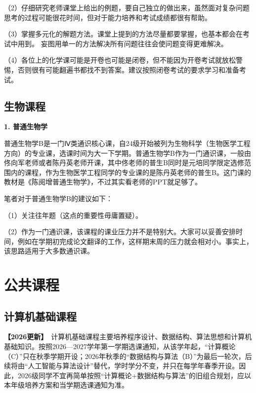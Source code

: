 \documentclass[11pt,oneside]{book}
\newcommand{\updateMark}{\textcolor{chaph}{\textbf{【2026更新】}}\ }
\begin{document}
\vspace{10pt}

（2）仔细研究老师课堂上给出的例题，要自己独立的做出来，虽然面对复杂问题思考的过程可能很花时间，但对于能力培养和考试成绩都很有帮助。

\vspace{10pt}

（3）掌握多元化的解题方法。课堂上提到的方法尽量都要掌握，也基本都会在考试中用到。 妄图用单一的方法解决所有问题往往会使问题变得更难解决。

\vspace{10pt}

（4）各位上的化学课可能是开卷也可能是闭卷，但不能因为开卷考试就放松警惕，否则很有可能翻遍书都找不到答案。建议按照闭卷考试的要求学习和准备考试。

\subsection{生物课程}

\textbf{1. 普通生物学}

普通生物学B是一门Ⅳ类通识核心课，自24级开始被列为生物科学（生物医学工程方向）的专业课，选课时间为大一下学期。普通生物学B作为一门通识课，一般由佟向军老师或者陈丹英老师开课，其中佟老师的普生B同时是元培同学限定选修范围内的课程，作为生物医学工程同学的专业课的是陈丹英老师的普生B。这门课的教材是《陈阅增普通生物学》，不过其实看老师的PPT就足够了。

\vspace{10pt}

笔者对于普通生物学B的建议如下：

\vspace{10pt}

（1）关注往年题（这点的重要性毋庸置疑）。

\vspace{10pt}

（2）作为一门通识课，该课程的课业压力并不是特别大。大家可以妥善安排时间，例如在学期初完成论文翻译的工作，这样期末周的压力就会相对小。事实上，该思路适用于大多数通识课。

\section{公共课程}
\subsection{计算机基础课程}

\updateMark 计算机基础课程主要培养程序设计、数据结构、算法思想和计算机基础知识。按照2026—2027学年第一学期选课通知，从该学年起，“计算概论（C）”只在秋季学期开设；2026年秋季的“数据结构与算法（B）”为最后一轮次，后续将由“人工智能与算法设计”替代，学时学分不变，并只在每学年春季开设。因此，2026级同学不宜再简单按照“计算概论+数据结构与算法”的旧组合规划，应以本年级培养方案和当学期选课通知为准。
\end{document}
